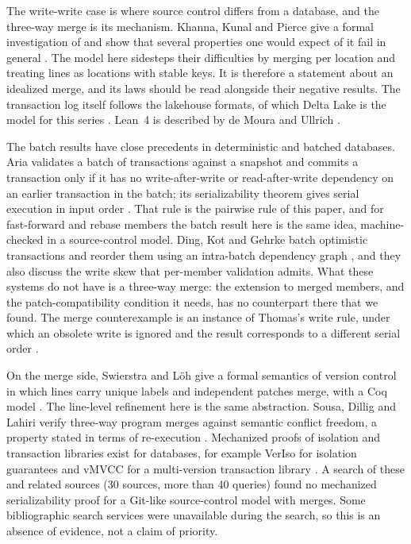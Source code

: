 \documentclass[11pt,letterpaper]{article}
\theoremstyle{definition}
\theoremstyle{remark}
\begin{document}
The write-write case is where source control differs from a database, and the three-way merge is its mechanism. Khanna, Kunal and Pierce give a formal investigation of  and show that several properties one would expect of it fail in general \cite{khanna2007diff3}. The model here sidesteps their difficulties by merging per location and treating lines as locations with stable keys. It is therefore a statement about an idealized merge, and its laws should be read alongside their negative results. The transaction log itself follows the lakehouse formats, of which Delta Lake is the model for this series \cite{armbrust2020delta}. Lean~4 is described by de Moura and Ullrich \cite{demoura2021lean4}.

The batch results have close precedents in deterministic and batched databases. Aria validates a batch of transactions against a snapshot and commits a transaction only if it has no write-after-write or read-after-write dependency on an earlier transaction in the batch; its serializability theorem gives serial execution in input order \cite{lu2020aria}. That rule is the pairwise rule of this paper, and for fast-forward and rebase members the batch result here is the same idea, machine-checked in a source-control model. Ding, Kot and Gehrke batch optimistic transactions and reorder them using an intra-batch dependency graph \cite{ding2018batching}, and they also discuss the write skew that per-member validation admits. What these systems do not have is a three-way merge: the extension to merged members, and the patch-compatibility condition it needs, has no counterpart there that we found. The merge counterexample is an instance of Thomas's write rule, under which an obsolete write is ignored and the result corresponds to a different serial order \cite[Section~4.5]{bhg1987}.

On the merge side, Swierstra and L\"oh give a formal semantics of version control in which lines carry unique labels and independent patches merge, with a Coq model \cite{swierstra2014semantics}. The line-level refinement here is the same abstraction. Sousa, Dillig and Lahiri verify three-way program merges against semantic conflict freedom, a property stated in terms of re-execution \cite{sousa2018merge}. Mechanized proofs of isolation and transaction libraries exist for databases, for example VerIso for isolation guarantees \cite{ghasemirad2025veriso} and vMVCC for a multi-version transaction library \cite{chang2023vmvcc}. A search of these and related sources (30 sources, more than 40 queries) found no mechanized serializability proof for a Git-like source-control model with merges. Some bibliographic search services were unavailable during the search, so this is an absence of evidence, not a claim of priority.
\end{document}
